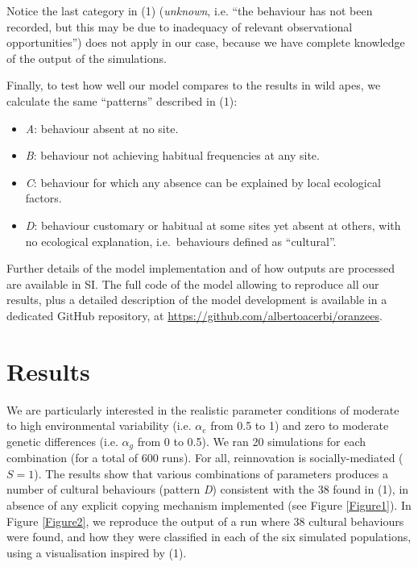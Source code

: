 \documentclass[9pt,twocolumn,twoside,]{pnas-new}
\begin{document}
Notice the last category in (1) (\emph{unknown}, i.e. ``the behaviour
has not been recorded, but this may be due to inadequacy of relevant
observational opportunities'') does not apply in our case, because we
have complete knowledge of the output of the simulations.

Finally, to test how well our model compares to the results in wild
apes, we calculate the same ``patterns'' described in (1):

\begin{itemize}
\item
  \emph{A}: behaviour absent at no site.
\item
  \emph{B}: behaviour not achieving habitual frequencies at any site.
\item
  \emph{C}: behaviour for which any absence can be explained by local
  ecological factors.
\item
  \emph{D}: behaviour customary or habitual at some sites yet absent at
  others, with no ecological explanation, i.e.~behaviours defined as
  ``cultural''.
\end{itemize}

Further details of the model implementation and of how outputs are
processed are available in SI. The full code of the model allowing to
reproduce all our results, plus a detailed description of the model
development is available in a dedicated GitHub repository, at
\url{https://github.com/albertoacerbi/oranzees}.

\section*{Results}\label{results}

We are particularly interested in the realistic parameter conditions of
moderate to high environmental variability (i.e. \(\alpha_e\) from 0.5
to 1) and zero to moderate genetic differences (i.e. \(\alpha_g\) from 0
to 0.5). We ran 20 simulations for each combination (for a total of 600
runs). For all, reinnovation is socially-mediated (\(S=1\)). The results
show that various combinations of parameters produces a number of
cultural behaviours (pattern \emph{D}) consistent with the 38 found in
(1), in absence of any explicit copying mechanism implemented (see
Figure \ref{Figure1}). In Figure \ref{Figure2}, we reproduce the output
of a run where 38 cultural behaviours were found, and how they were
classified in each of the six simulated populations, using a
visualisation inspired by (1).
\end{document}
